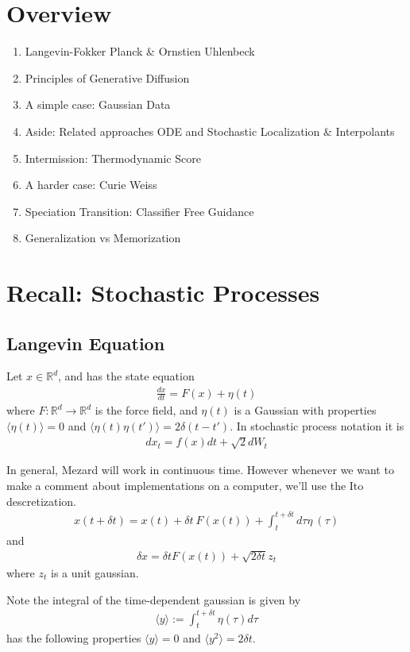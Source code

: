 \section{Overview}
\begin{enumerate}
	\item Langevin-Fokker Planck \& Ornstien Uhlenbeck
	\item Principles of Generative Diffusion
	\item A simple case: Gaussian Data
	\item Aside: Related approaches ODE and Stochastic Localization \& Interpolants
	\item Intermission: Thermodynamic Score
	\item A harder case: Curie Weiss
	\item Speciation Transition: Classifier Free Guidance
	\item Generalization vs Memorization
\end{enumerate}

\section{Recall: Stochastic Processes}
\subsection{Langevin Equation}
Let $x \in \mathbb R^d$, and has the state equation
\begin{align}
	\frac{dx}{dt} = F(x) + \eta(t)
\end{align}
where $F: \mathbb R^d \to \mathbb R^d$ is the force field, and $\eta(t)$ is a Gaussian with properties $\langle \eta(t)\rangle = 0$ and $\langle \eta(t) \eta(t') \rangle = 2 \delta(t - t')$. In stochastic process notation it is
\begin{align}
	dx_t = f(x) dt + \sqrt{2	} dW_t
\end{align}
\begin{sidework}
	In general, Mezard will work in continuous time. However whenever we want to make a comment about implementations on a computer, we'll use the Ito descretization.
	\begin{align}
		x(t + \delta t) = x(t) + \delta t ~F(x(t)) + \int_{t}^{t + \delta t} d\tau \eta~ (\tau)
	\end{align}
	and
	\begin{align}
		\delta x = \delta t F(x(t)) + \sqrt{2 \delta t} z_t
	\end{align}
	where $z_t$ is a unit gaussian.
\end{sidework}
\begin{sidework}
	Note the integral of the time-dependent gaussian is given by
	\begin{align}
		\langle y \rangle := \int_t^{t+\delta t} \eta (\tau) d \tau
	\end{align}
	has the following properties $\langle y \rangle = 0$ and $\langle y^2\rangle = 2 \delta t$.
\end{sidework}
